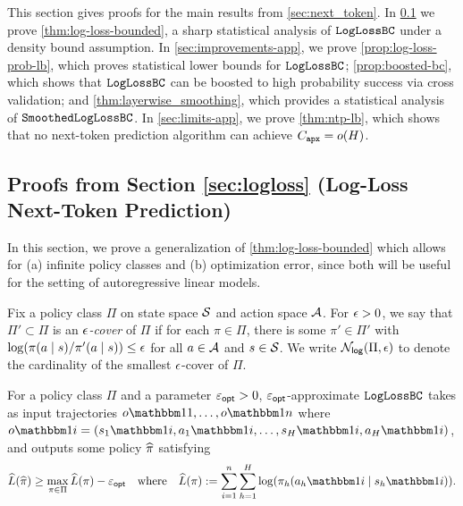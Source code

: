 
This section gives proofs for the main results from
\cref{sec:next_token}. In \cref{sec:log-loss-app} we prove \cref{thm:log-loss-bounded}, a sharp statistical analysis of $\texttt{LogLossBC}$ under a density bound assumption. In \cref{sec:improvements-app}, we prove \cref{prop:log-loss-prob-lb}, which proves statistical lower bounds for $\texttt{LogLossBC}$; \cref{prop:boosted-bc}, which shows that $\texttt{LogLossBC}$ can be boosted to high probability success via cross validation; and \cref{thm:layerwise_smoothing}, which provides a statistical analysis of $\texttt{SmoothedLogLossBC}$. In \cref{sec:limits-app}, we prove \cref{thm:ntp-lb}, which shows that no next-token prediction algorithm can achieve $C_{\texttt{apx}} = o(H)$.


\subsection{Proofs from Section \ref*{sec:logloss} (Log-Loss Next-Token Prediction)}\label{sec:log-loss-app}


In this section, we prove a generalization of \cref{thm:log-loss-bounded} which allows for (a) infinite policy classes and (b) optimization error, since both will be useful for the setting of autoregressive linear models.

\begin{definition}\label{def:cover}
Fix a policy class $\Pi$ on state space $\mathcal{S}$ and action space $\mathcal{A}$. For $\epsilon>0$, we say that $\Pi' \subset \Pi$ is an \emph{$\epsilon$-cover} of $\Pi$ if for each $\pi\in\Pi$, there is some $\pi'\in\Pi'$ with $\log(\pi(a\mid{}s)/\pi'(a\mid{}s)) \leq \epsilon$ for all $a\in\mathcal{A}$ and $s\in\mathcal{S}$. We write $\mathcal{N}_{\mathsf{log}}(\Pi,\epsilon)$ to denote the cardinality of the smallest $\epsilon$-cover of $\Pi$.
\end{definition}

For a policy class $\Pi$ and a parameter $\varepsilon_{\mathsf{opt}}>0$, $\varepsilon_{\mathsf{opt}}$-approximate $\texttt{LogLossBC}$ takes as input trajectories $o\ind{1},\dots,o\ind{n}$ where $o\ind{i} = (s_1\ind{i},a_1\ind{i},\dots,s_H\ind{i},a_H\ind{i})$, and outputs some policy $\widehat{\pi}$ satisfying
\[\wh L(\pihat) \geq \max_{\pi \in \Pi} \wh L(\pi) - \epopt \quad\text{where}\quad \wh L(\pi) := \sum_{i=1}^n \sum_{h=1}^H \log (\pihi).\]

